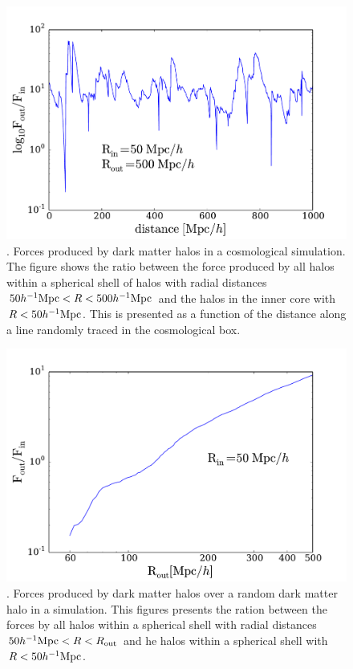 \documentclass{article}
\newcommand{\hMpc}{{\ifmmode{h^{-1}{\rm Mpc}}\else{$h^{-1}$Mpc }\fi}}
\begin{document}
\begin{figure}
\begin{center}
\includegraphics[width=0.8\linewidth,angle=0]{trace_nbody_200_1000.pdf}
\caption{\label{fig:trace_nbody}. Forces produced by dark matter halos in a
cosmological simulation. The figure shows the ratio between the force
produced by all halos within a spherical shell of halos with radial
distances $50\hMpc <R<500\hMpc$ and the halos in the inner core with
$R<50\hMpc$. This is presented as a function of the distance along a
line randomly traced in the cosmological box.}
\end{center}
\end{figure}



\begin{figure}
\begin{center}
\includegraphics[width=0.8\linewidth,angle=0]{spheres_nbody_radius_200_1000.pdf}
\caption{\label{fig:spheres_radius}. Forces produced by dark matter
  halos over a random dark matter halo in a simulation. This figures
  presents the ration between the forces by all halos within a
  spherical shell with radial distances $50\hMpc < R < R_{\rm out}$
  and he halos within a spherical shell with $R<50\hMpc$. } 
\end{center}
\end{figure}
\end{document}

